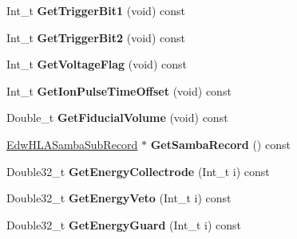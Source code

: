 \begin{DoxyCompactItemize}
\item 
\hypertarget{class_edw_h_l_a_single_bolo_sub_record_a88964cc93c08738ecfccced1782ef293}{
Int\_\-t {\bfseries GetTriggerBit1} (void) const }
\label{class_edw_h_l_a_single_bolo_sub_record_a88964cc93c08738ecfccced1782ef293}

\item 
\hypertarget{class_edw_h_l_a_single_bolo_sub_record_af90c308c9e4b32b24ed7616c26982d95}{
Int\_\-t {\bfseries GetTriggerBit2} (void) const }
\label{class_edw_h_l_a_single_bolo_sub_record_af90c308c9e4b32b24ed7616c26982d95}

\item 
\hypertarget{class_edw_h_l_a_single_bolo_sub_record_a2a4738c656dacfa2033d53a2b06875fd}{
Int\_\-t {\bfseries GetVoltageFlag} (void) const }
\label{class_edw_h_l_a_single_bolo_sub_record_a2a4738c656dacfa2033d53a2b06875fd}

\item 
\hypertarget{class_edw_h_l_a_single_bolo_sub_record_a6e79ab31e10990264d54801bed0f676d}{
Int\_\-t {\bfseries GetIonPulseTimeOffset} (void) const }
\label{class_edw_h_l_a_single_bolo_sub_record_a6e79ab31e10990264d54801bed0f676d}

\item 
\hypertarget{class_edw_h_l_a_single_bolo_sub_record_a8414497926c74cf32b2f96e5e85ab30e}{
Double\_\-t {\bfseries GetFiducialVolume} (void) const }
\label{class_edw_h_l_a_single_bolo_sub_record_a8414497926c74cf32b2f96e5e85ab30e}

\item 
\hypertarget{class_edw_h_l_a_single_bolo_sub_record_a4f470741c8f91d33bc9333764b4f8a95}{
\hyperlink{class_edw_h_l_a_samba_sub_record}{EdwHLASambaSubRecord} $\ast$ {\bfseries GetSambaRecord} () const }
\label{class_edw_h_l_a_single_bolo_sub_record_a4f470741c8f91d33bc9333764b4f8a95}

\item 
\hypertarget{class_edw_h_l_a_single_bolo_sub_record_ae8b86a39d5ffbb27b6e9a22dff429ddb}{
Double32\_\-t {\bfseries GetEnergyCollectrode} (Int\_\-t i) const }
\label{class_edw_h_l_a_single_bolo_sub_record_ae8b86a39d5ffbb27b6e9a22dff429ddb}

\item 
\hypertarget{class_edw_h_l_a_single_bolo_sub_record_a7a390d9939b3a1cb474cfdd94f679948}{
Double32\_\-t {\bfseries GetEnergyVeto} (Int\_\-t i) const }
\label{class_edw_h_l_a_single_bolo_sub_record_a7a390d9939b3a1cb474cfdd94f679948}

\item 
\hypertarget{class_edw_h_l_a_single_bolo_sub_record_a2da48692032aba1aa1f6c08a07e06f81}{
Double32\_\-t {\bfseries GetEnergyGuard} (Int\_\-t i) const }
\label{class_edw_h_l_a_single_bolo_sub_record_a2da48692032aba1aa1f6c08a07e06f81}


\end{DoxyCompactItemize}
